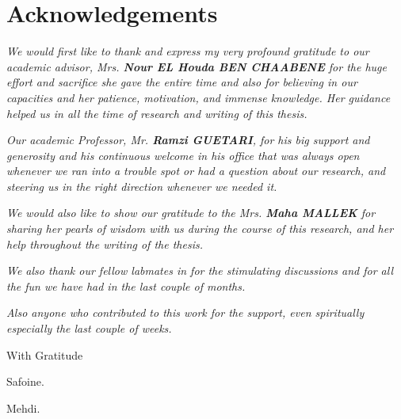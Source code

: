 \chapter*{Acknowledgements}

\begin{center}
\emph{We would first like to thank and express my very profound gratitude to our academic advisor, Mrs. \textbf{Nour EL Houda BEN CHAABENE} for the huge effort and sacrifice she gave the entire time and also for believing in our capacities and her patience, motivation, and immense knowledge. Her guidance helped us in all the time of research and writing of this thesis.}\\
\end{center}
\begin{center}
\emph{Our academic Professor, Mr. \textbf{Ramzi GUETARI}, for his big support and generosity and his continuous welcome in his office that was always open whenever we ran into a trouble spot or had a question about our research, and steering us in the right direction whenever we needed it.}\\
\end{center}
\begin{center}
\emph{We would also like to show our gratitude to the Mrs. \textbf{Maha MALLEK} for sharing her pearls of wisdom with us during the course of this research, and her help throughout the writing of the thesis.} \\
\end{center}
\begin{center}
\emph{We also thank our fellow labmates in for the stimulating discussions and for all the fun we have had in the last couple of months.}\\
\end{center}
\begin{center}
\emph{Also  anyone who contributed to this work for the support, even spiritually especially the last couple of weeks.}\\
\end{center}

\begin{flushright}
With Gratitude

Safoine.

Mehdi.
\end{flushright}

